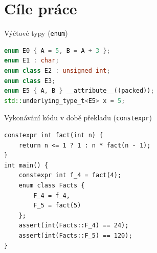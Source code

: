 \documentclass[11pt]{beamer}
\begin{document}
\section{Cíle práce}






\begin{frame}[fragile]{Výčtové typy (\texttt{enum})}
\begin{lstlisting}[language=C++]
enum E0 { A = 5, B = A + 3 };
enum E1 : char;
enum class E2 : unsigned int;
enum class E3;
enum E5 { A, B } __attribute__((packed));
std::underlying_type_t<E5> x = 5;
\end{lstlisting}
\end{frame}




\begin{frame}[fragile]{Vykonávání kódu v době překladu (\texttt{constexpr})}
\begin{lstlisting}
constexpr int fact(int n) {
	return n <= 1 ? 1 : n * fact(n - 1);
}
int main() {
	constexpr int f_4 = fact(4);
	enum class Facts {
		F_4 = f_4,
		F_5 = fact(5)
	};
	assert(int(Facts::F_4) == 24);
	assert(int(Facts::F_5) == 120);
}
\end{lstlisting}
\end{frame}
\end{document}
